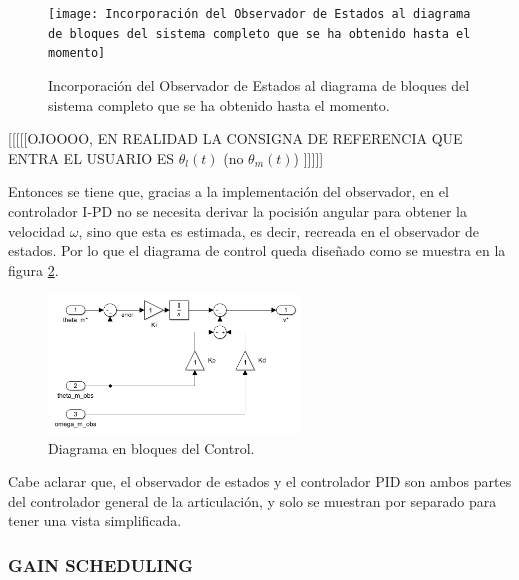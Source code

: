 \documentclass{article}
\begin{document}
\begin{sloppypar}
\begin{figure}[H]
    \centering
    \texttt{[image: Incorporación del Observador de Estados al diagrama de bloques del sistema completo que se ha obtenido hasta el momento]}
    \caption{Incorporación del Observador de Estados al diagrama de bloques del sistema completo que se ha obtenido hasta el momento.}
    \label{fig:Incorporación del Observador de Estados al diagrama de bloques del sistema completo que se ha obtenido hasta el momento}
\end{figure}
[[[[[OJOOOO, EN REALIDAD LA CONSIGNA DE REFERENCIA QUE ENTRA EL USUARIO ES $\theta_l(t)$ (no $\theta_m(t)$) ]]]]]

Entonces se tiene que, gracias a la implementación del observador, en el controlador I-PD no se necesita derivar la pocisión angular para obtener la velocidad $\omega$, sino que esta es estimada, es decir, recreada en el observador de estados. Por lo que el diagrama de control queda diseñado como se muestra en la figura \ref{fig:Diagrama en bloques del Control}.

\begin{figure}[H]
    \centering
    \includegraphics[width=0.60\textwidth]{Diagrama en bloques del Control}
    \caption{Diagrama en bloques del Control.}
    \label{fig:Diagrama en bloques del Control}
\end{figure}

Cabe aclarar que, el observador de estados y el controlador PID son ambos partes del controlador general de la articulación, y solo se muestran por separado para tener una vista simplificada.



\subsubsection{GAIN SCHEDULING}
\label{sec:GAIN SCHEDULING}


\end{sloppypar}
\end{document}
